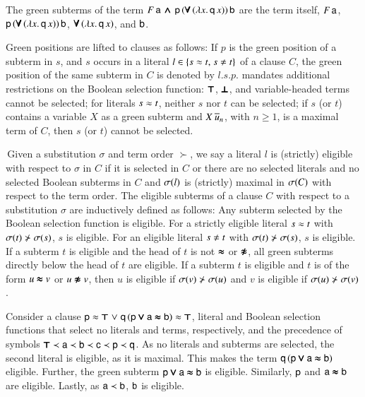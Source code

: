 \begin{exa} The green subterms of the term $F \, \mathsf{a} \, \pmb{\land} \, \mathsf{p} \,
(\pmb{\forall} \, (\lambda x. \, \mathsf{q} \, x)) \, \mathsf{b}$ are the term itself, $F \, \mathsf{a}$, $\mathsf{p} \, (\pmb{\forall} \, (\lambda x. \, \mathsf{q} \, x))
\, \mathsf{b}$, $\pmb{\forall} \, (\lambda x. \, \mathsf{q} \, x)$, and $\mathsf{b}$.
\end{exa} 
%
Green positions are lifted to clauses as follows: If $p$ is the green position
of a subterm in $s$, and $s$ occurs in a literal $l \in \{s \eq t{,}\; s \not\eq
t\}$ of a clause $C$, the green position of the same subterm in $C$ is denoted by $l.s.p$.
\osup{} mandates additional restrictions on the Boolean selection function:
$\pmb{\top}$, $\pmb{\bot}$, and variable-headed terms cannot be selected; for literals
$s \approx t$, neither $s$ nor $t$ can be selected; if $s$ (or $t$) contains a
variable $X$ as a green subterm and $X\> \overline{u}_{n}$, with $n \ge 1$, is a
maximal term of $C$, then $s$ (or $t$) cannot be selected.

\begin{defi}[Eligibility]
  \,Given a substitution $\sigma$ and term order $\succ$, we say a literal $l$
  is (strictly) eligible with respect to $\sigma$ in $C$ if it is selected in
  $C$ or there are no selected literals and no selected Boolean subterms in
  $C$ and $\sigma(l)$ is (strictly) maximal in $\sigma(C)$ with respect to the
  term order.
%
  The eligible subterms of a clause $C$ with respect to a substitution
  $\sigma$ are inductively defined as follows:
  Any subterm selected by the Boolean selection function is eligible.
  For a strictly eligible literal $s \approx t$ with $\sigma(t) \not\succ
  \sigma(s)$, $s$ is eligible. For an eligible literal $s \not\eq t$ with
  $\sigma(t) \not\succ \sigma(s)$, $s$ is eligible. If a subterm $t$ is eligible
  and the head of $t$ is not $\pmb{\approx}$ or $\pmb{\not\approx}$, all green subterms directly below the head of
  $t$ are eligible. If a subterm $t$ is eligible and $t$ is of the form $u
  \pmb{\approx} v$ or $u \pmb{\not\approx} v$, then $u$ is eligible if $\sigma(v) \not\succ \sigma(u)$
  and $v$ is eligible if $\sigma(u) \not\succ \sigma(v)$.
\end{defi}

\begin{exa}
  Consider a clause $\mathsf{p} \approx \pmb{\top} \mathrel\lor \mathsf{q} \, (\mathsf{p} \pmb{\lor} \mathsf{a}
  \pmb{\approx} \mathsf{b}) \approx \pmb{\top}$, literal and Boolean selection functions that select no
  literals and terms, respectively, and the precedence of symbols $\pmb{\top} \prec
  \mathsf{a} \prec \mathsf{b} \prec \mathsf{c} \prec \mathsf{p} \prec \mathsf{q}$. As no
  literals and subterms are selected, the second literal is eligible, as it is maximal. This makes the term 
  $\mathsf{q} \, (\mathsf{p} \pmb{\lor} \mathsf{a} \pmb{\approx} \mathsf{b})$ eligible. Further, the green subterm
  $\mathsf{p} \pmb{\lor} \mathsf{a} \pmb{\approx} \mathsf{b}$ is eligible. Similarly, $\mathsf{p}$ and $\mathsf{a} \pmb{\approx} \mathsf{b}$
  are eligible. Lastly, as $\mathsf{a} \prec \mathsf{b}$, $\mathsf{b}$ is eligible.
\end{exa}

